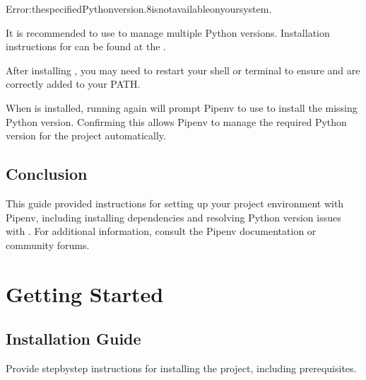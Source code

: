 \documentclass[letterpaper,10pt,english]{sphinxmanual}
\begin{document}
\begin{sphinxVerbatim}[commandchars=\\\{\}]
Error:thespecifiedPythonversion.8isnotavailableonyoursystem.
\end{sphinxVerbatim}

\sphinxAtStartPar
It is recommended to use  to manage multiple Python versions. Installation instructions for  can be found at the .

\sphinxAtStartPar
After installing , you may need to restart your shell or terminal to ensure  and  are correctly added to your PATH.

\sphinxAtStartPar
When  is installed, running  again will prompt Pipenv to use  to install the missing Python version. Confirming this allows Pipenv to manage the required Python version for the project automatically.


\section{Conclusion}
\label{\detokenize{setup_guide:conclusion}}
\sphinxAtStartPar
This guide provided instructions for setting up your project environment with Pipenv, including installing dependencies and resolving Python version issues with . For additional information, consult the Pipenv documentation or community forums.

\sphinxstepscope


\chapter{Getting Started}
\label{\detokenize{getting_started:getting-started}}\label{\detokenize{getting_started::doc}}

\section{Installation Guide}
\label{\detokenize{getting_started:installation-guide}}
\sphinxAtStartPar
Provide step\sphinxhyphen{}by\sphinxhyphen{}step instructions for installing the project, including prerequisites.
\end{document}

